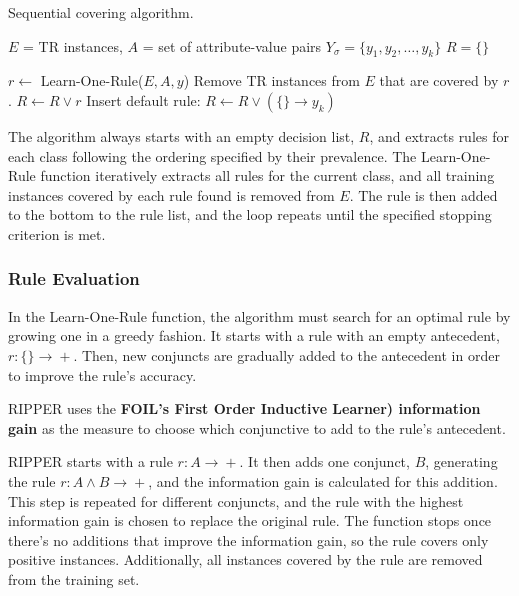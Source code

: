 \begin{algorithm}
\caption{Sequential covering algorithm.}
\begin{algorithmic}[1]
    \State $E$ = TR instances, $A$ = set of attribute-value pairs
    \State $Y_{\sigma} = \{y_1, y_2, \dots , y_k\}$
    \State $R = \{ \}$

            \State $r \xleftarrow{}$ Learn-One-Rule($E,A,y$)
            \State Remove TR instances from $E$ that are covered by $r$.
            \State $R \xleftarrow{} R \lor r$
        \EndWhile
    \EndFor
    \State Insert default rule: $R \xleftarrow{} R \lor (\{\} \xrightarrow{} y_k)$
\end{algorithmic}
\end{algorithm}

The algorithm always starts with an empty decision list, $R$, and extracts rules for each class following the ordering specified by their prevalence. The Learn-One-Rule function iteratively extracts all rules for the current class, and all training instances covered by each rule found is removed from $E$. The rule is then added to the bottom to the rule list, and the loop repeats until the specified stopping criterion is met.

\subsubsection{Rule Evaluation}

In the Learn-One-Rule function, the algorithm must search for an optimal rule by growing one in a greedy fashion. It starts with a rule with an empty antecedent, $r : \{ \} \xrightarrow{} +$. Then, new conjuncts are gradually added to the antecedent in order to improve the rule's accuracy.

RIPPER uses the \textbf{FOIL's First Order Inductive Learner) information gain} as the measure to choose which conjunctive to add to the rule's antecedent.

RIPPER starts with a rule $r : A \xrightarrow{} +$. It then adds one conjunct, $B$, generating the rule $r : A \land B \xrightarrow{} +$, and the information gain is calculated for this addition. This step is repeated for different conjuncts, and the rule with the highest information gain is chosen to replace the original rule. The function stops once there's no additions that improve the information gain, so the rule covers only positive instances. Additionally, all instances covered by the rule are removed from the training set.

